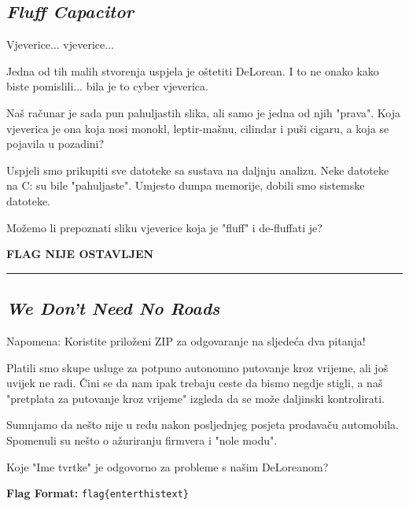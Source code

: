 \documentclass{article}
\begin{document}
\subsection{\textit{Fluff Capacitor}}
\begin{tcolorbox}[
    colback=gray!5,  %
    colframe=gray!75,  %
    title=\textbf{Zadatak}]
    Vjeverice... vjeverice...

    Jedna od tih malih stvorenja uspjela je oštetiti DeLorean. I to ne onako kako biste pomislili... bila je to cyber vjeverica.

    Naš računar je sada pun pahuljastih slika, ali samo je jedna od njih "prava". Koja vjeverica je ona koja nosi monokl, leptir-mašnu, cilindar i puši cigaru, a koja se pojavila u pozadini?

    Uspjeli smo prikupiti sve datoteke sa sustava na daljnju analizu. Neke datoteke na C: su bile "pahuljaste". Umjesto dumpa memorije, dobili smo sistemske datoteke.

    Možemo li prepoznati sliku vjeverice koja je "fluff" i de-fluffati je?
\end{tcolorbox}

\begin{center}
    \textbf{FLAG NIJE OSTAVLJEN}
\end{center}

\noindent\rule{\textwidth}{0.4pt}


\subsection{\textit{We Don't Need No Roads}}
\begin{tcolorbox}[
    colback=gray!5,  %
    colframe=gray!75,  %
    title=\textbf{Zadatak}]
    Napomena: Koristite priloženi ZIP za odgovaranje na sljedeća dva pitanja!

    Platili smo skupe usluge za potpuno autonomno putovanje kroz vrijeme, ali još uvijek ne radi. Čini se da nam ipak trebaju ceste da bismo negdje stigli, a naš "pretplata za putovanje kroz vrijeme" izgleda da se može daljinski kontrolirati.

    Sumnjamo da nešto nije u redu nakon posljednjeg posjeta prodavaču automobila. Spomenuli su nešto o ažuriranju firmvera i "nole modu".

    Koje "Ime tvrtke" je odgovorno za probleme s našim DeLoreanom?

    \textbf{Flag Format:} \texttt{flag\{enterthistext\}}

\end{tcolorbox}
\end{document}
